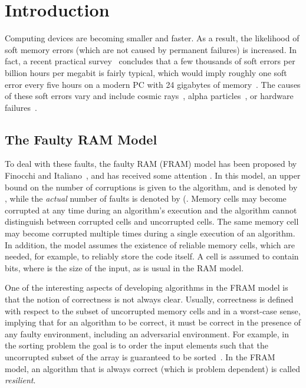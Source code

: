 \documentclass{llncs}
\begin{document}
\section{Introduction}
\label{sec:introduction}

Computing devices are becoming smaller and faster. As a result, the likelihood of soft memory errors (which are not caused by permanent failures) is increased. In fact, a recent practical survey~\cite{soft_error_rate} concludes that a few thousands of soft errors per billion hours per megabit is fairly typical, which would imply roughly one soft error every five hours on a modern PC with 24 gigabytes of memory~\cite{CDK11}. The causes of these soft errors vary and include cosmic rays~\cite{radiation}, alpha particles~\cite{alpha_particles}, or hardware failures~\cite{hardware_errors}.

\subsection{The Faulty RAM Model}

To deal with these faults, the faulty RAM (FRAM) model has been proposed by Finocchi and Italiano~\cite{resilient_data_structures}, and has received some attention \linebreak \cite{optimal_resilient_dictionaries,resilient_and_external_memory,resilient_counters,dynamic_programming,resilient_sorting,resilient_dictionaries,kd_trees,resilient_priority_queues}. \linebreak In this model, an upper bound on the number of corruptions is given to the algorithm, and is denoted by , while the \emph{actual} number of faults is denoted by  (. Memory cells may become corrupted at any time during an algorithm's execution and the algorithm cannot distinguish between corrupted cells and uncorrupted cells. The same memory cell may become corrupted multiple times during a single execution of an algorithm. In addition, the model assumes the existence of  reliable memory cells, which are needed, for example, to reliably store the code itself. A cell is assumed to contain  bits, where  is the size of the input, as is usual in the RAM model.

One of the interesting aspects of developing algorithms in the FRAM model is that the notion of correctness is not always clear. Usually, correctness is defined with respect to the subset of uncorrupted memory cells and in a worst-case sense, implying that for an algorithm to be correct, it must be correct in the presence of any faulty environment, including an adversarial environment. For example, in the sorting problem the goal is to order the input elements such that the uncorrupted subset of the array is guaranteed to be sorted~\cite{resilient_data_structures}. In the FRAM model, an algorithm that is always correct (which is problem dependent) is called \emph{resilient}.
\end{document}
